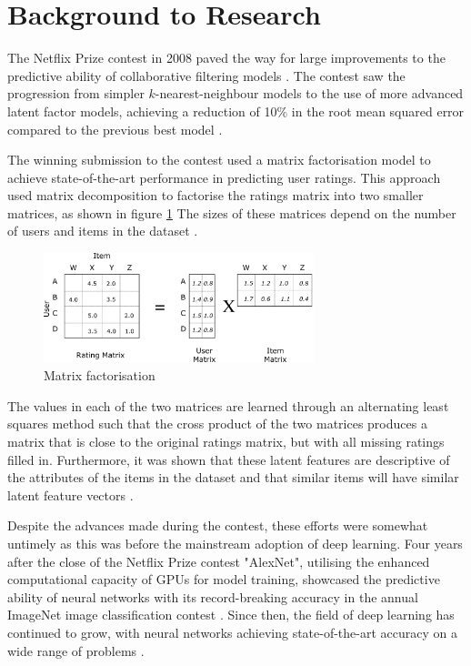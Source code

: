 \section{Background to Research}
The Netflix Prize contest in 2008 paved the way for large improvements to the predictive ability of collaborative filtering models \parencite{netflix_description}. The contest saw the progression from simpler $k$-nearest-neighbour models to the use of more advanced latent factor models, achieving a reduction of 10\% in the root mean squared error compared to the previous best model \parencite{netflix_bellkor}.

The winning submission to the contest used a matrix factorisation model to achieve state-of-the-art performance in predicting user ratings. This approach used matrix decomposition to factorise the ratings matrix into two smaller matrices, as shown in figure \ref{fig:1_mat-fac} The sizes of these matrices depend on the number of users and items in the dataset \parencite{netflix_bellkor}.

\begin{figure}[H]
\centering
\includegraphics[width=0.7\textwidth]{Figures/1_matrix-factorisation.png}
\decoRule
\caption[Matrix factorisation]{Matrix factorisation \parencite{liao2018towardsdatascience}}
\label{fig:1_mat-fac}
\end{figure}

The values in each of the two matrices are learned through an alternating least squares method such that the cross product of the two matrices produces a matrix that is close to the original ratings matrix, but with all missing ratings filled in. Furthermore, it was shown that these latent features are descriptive of the attributes of the items in the dataset and that similar items will have similar latent feature vectors \parencite{koren2009matrix}.

Despite the advances made during the contest, these efforts were somewhat untimely as this was before the mainstream adoption of deep learning. Four years after the close of the Netflix Prize contest "AlexNet", utilising the enhanced computational capacity of GPUs for model training, showcased the predictive ability of neural networks with its record-breaking accuracy in the annual ImageNet image classification contest \parencite{krizhevsky2012imagenet}. Since then, the field of deep learning has continued to grow, with neural networks achieving state-of-the-art accuracy on a wide range of problems \parencite{alom2018history}.

